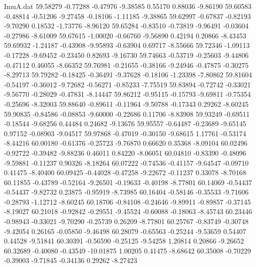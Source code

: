 \begin{filecontents}{ImuA.dat}
  59.58279   -0.77288   -0.47976   -9.38585    0.55170    0.88036   -9.86190
  59.60583   -0.48814   -0.51206   -9.27458   -0.18106   -1.11185   -9.38865
  59.62997   -0.67837   -0.82193   -9.70290    0.18532   -1.73776   -8.96120
  59.65284   -0.83510   -0.73819   -9.96491   -0.03604   -0.27986   -8.61009
  59.67615   -1.00020   -0.66760   -9.56890    0.42194    0.20866   -8.43453
  59.69932   -1.24187   -0.43908   -9.95893   -0.63904    0.69717   -8.55666
  59.72346   -1.09113   -0.17228   -9.69452   -0.23450    0.82693   -9.16730
  59.74663   -0.53719   -0.25603   -9.44806   -0.47112    0.46055   -8.66352
  59.76981   -0.21655   -0.38166   -9.24946   -0.47875   -0.30275   -8.29713
  59.79282   -0.18425   -0.36491   -9.37628   -0.18106   -1.23398   -7.80862
  59.81604   -0.54197   -0.36012   -9.72682   -0.56271   -0.85233   -7.75519
  59.83894   -0.72742   -0.33021   -9.56770   -0.28029   -0.47831   -8.14447
  59.86212   -0.95115   -0.15793   -9.69811   -0.75354   -0.25696   -8.32003
  59.88640   -0.89611   -0.11964   -9.50788   -0.17343    0.29262   -8.60245
  59.90835   -0.84586   -0.08853   -9.60000   -0.22686    0.11706   -8.83908
  59.93249   -0.69511   -0.18544   -9.68256    0.44484    0.24682   -9.13676
  59.95557   -0.64487   -0.23689   -9.65145    0.97152   -0.08903   -9.04517
  59.97868   -0.47019   -0.30150   -9.68615    1.17761   -0.53174   -8.44216
  60.00180   -0.61376   -0.25723   -9.76870    0.66620    0.35368   -8.09104
  60.02496   -0.92722   -0.39482   -9.88236    0.46011    0.84220   -8.06051
  60.04810   -0.83390   -0.48096   -9.59881   -0.11237    0.90326   -8.18264
  60.07222   -0.74536   -0.41157   -9.64547   -0.09710    0.41475   -8.40400
  60.09425   -0.44028   -0.47258   -9.22672   -0.11237    0.33078   -8.70168
  60.11855   -0.43789   -0.52164   -9.26501   -0.19633   -0.40198   -8.77801
  60.14069   -0.54437   -0.54437   -9.82732    0.23875   -0.95919   -8.73985
  60.16404   -0.58146   -0.35533   -9.71606   -0.28793   -1.12712   -8.60245
  60.18706   -0.84108   -0.24646   -9.89911   -0.89857   -0.37145   -8.19027
  60.21018   -0.92842   -0.29551   -9.45524   -0.60088   -0.18063   -8.45743
  60.23446   -0.98943   -0.33021   -9.70290   -0.25739    0.26209   -8.77801
  60.25767   -0.83749   -0.30748   -9.42054    0.26165   -0.05850   -9.46498
  60.28079   -0.65563   -0.25244   -9.53659    0.54407    0.44528   -9.51841
  60.30391   -0.56590   -0.25125   -9.54258    1.20814    0.20866   -9.26652
  60.32689   -0.40080   -0.43549  -10.01875    1.00205    0.41475   -8.68642
  60.35008   -0.70229   -0.39003   -9.71845   -0.34136    0.29262   -8.27423

\end{filecontents}
